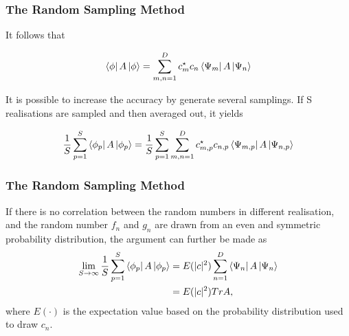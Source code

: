 \documentclass{beamer}
\begin{document}
\begin{frame}
	\frametitle{The Random Sampling Method}
	It follows that
	
	\begin{equation*}
	\begin{split}
	\bra{\phi}A\ket{\phi} = \sum_{m,n=1}^{D} c_m^\star c_n  \bra{\Psi_m}A\ket{\Psi_n}\\
	\end{split}
	\end{equation*}
	
	
	It is possible to increase the accuracy by generate several samplings. If S realisations are sampled and then averaged out, it yields 
	
	\begin{equation*}
	\begin{split}
	\label{random_sampling}
	\frac{1}{S}\sum_{p=1}^{S} \bra{\phi_p}A\ket{\phi_p} = \frac{1}{S} \sum_{p=1}^{S} \sum_{m,n=1}^{D} c_{m,p}^\star c_{n,p}  \bra{\Psi_{m,p}}A\ket{\Psi_{n,p}}
	\end{split}
	\end{equation*}
	

\end{frame}

\begin{frame}
	\frametitle{The Random Sampling Method}
	If there is no correlation between the random numbers in different realisation, and the random number $f_n$ and $g_n$ are drawn from an even and symmetric probability distribution, the argument can further be made as
	\begin{equation*}
	\begin{split}
	\lim_{S \to \infty} \frac{1}{S} \sum_{p=1}^{S}  \bra{\phi_p}A\ket{\phi_p} &= E(|c|^2)\sum_{n=1}^{D}\bra{\Psi_n}A\ket{\Psi_n}\\
	&=E(|c|^2) TrA,
	\end{split}
	\end{equation*}
	where $E(\cdot)$ is the expectation value based on the probability distribution used to draw $c_n$.
	

	
	
\end{frame}
\end{document}
